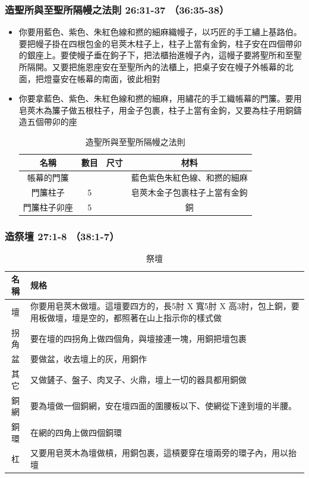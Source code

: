 \subsubsection{造聖所與至聖所隔幔之法則 26:31-37 （36:35-38）}
\begin{itemize} 
\itemsep-.35em
\item 你要用藍色、紫色、朱紅色線和撚的細麻織幔子，以巧匠的手工繡上基路伯。要把幔子掛在四根包金的皂莢木柱子上，柱子上當有金鉤，柱子安在四個帶卯的銀座上。要使幔子垂在鉤子下，把法櫃抬進幔子內，這幔子要將聖所和至聖所隔開。又要把施恩座安在至聖所內的法櫃上，把桌子安在幔子外帳幕的北面，把燈臺安在帳幕的南面，彼此相對
\item 你要拿藍色、紫色、朱紅色線和撚的細麻，用繡花的手工織帳幕的門簾。要用皂莢木為簾子做五根柱子，用金子包裹，柱子上當有金鉤，又要為柱子用銅鑄造五個帶卯的座
\begin{table}[H]
\centering
\begin{tabular}{|c|c|c|c| }
\hline
\hline
名稱   & 數目& 尺寸     & 材料  \\\hline
帳幕的門簾&       & &藍色紫色朱紅色線、和撚的細麻\\\hline
門簾柱子&   5    & &皂莢木金子包裹柱子上當有金鉤\\\hline
門簾柱子卯座& 5    &  &銅\\\hline
\end{tabular}
\caption{造聖所與至聖所隔幔之法則}
\end{table}
\end{itemize}

\subsubsection{造祭壇 27:1-8 （38:1-7）}
\begin{table}[H]
\centering
\begin{tabular}{|c|l| }
\hline
\hline
名稱 & 规格  \\\hline
壇 &你要用皂莢木做壇。這壇要四方的，長5肘 X 寬5肘 X 高3肘，包上銅，要用板做壇，壇是空的，都照著在山上指示你的樣式做 \\\hline
拐角&要在壇的四拐角上做四個角，與壇接連一塊，用銅把壇包裹  \\\hline
盆&要做盆，收去壇上的灰，用銅作    \\\hline
其它&又做鏟子、盤子、肉叉子、火鼎，壇上一切的器具都用銅做 \\\hline
銅網& 要為壇做一個銅網，安在壇四面的圍腰板以下、使網從下達到壇的半腰。 \\\hline
銅環&在網的四角上做四個銅環\\\hline
杠&又要用皂莢木為壇做槓，用銅包裹，這槓要穿在壇兩旁的環子內，用以抬壇\\\hline
\end{tabular}
\caption{祭壇}
\end{table}

